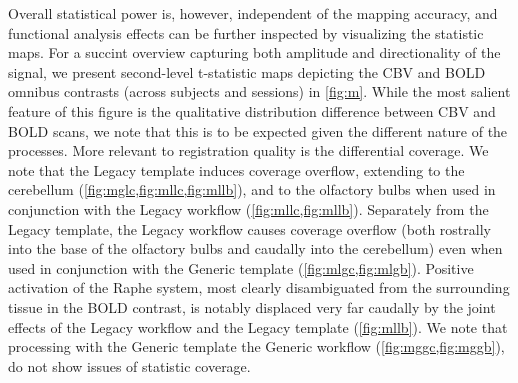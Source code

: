 Overall statistical power is, however, independent of the mapping accuracy, and functional analysis effects can be further inspected by visualizing the statistic maps.
For a succint overview capturing both amplitude and directionality of the signal, we present second-level t-statistic maps depicting the CBV and BOLD omnibus contrasts (across subjects and sessions) in \cref{fig:m}.
While the most salient feature of this figure is the qualitative distribution difference between CBV and BOLD scans, we note that this is to be expected given the different nature of the processes.
More relevant to registration quality is the differential coverage.
We note that the Legacy template induces coverage overflow, extending to the cerebellum (\cref{fig:mglc,fig:mllc,fig:mllb}), and to the olfactory bulbs when used in conjunction with the Legacy workflow (\cref{fig:mllc,fig:mllb}).
Separately from the Legacy template, the Legacy workflow causes coverage overflow (both rostrally into the base of the olfactory bulbs and caudally into the cerebellum) even when used in conjunction with the Generic template (\cref{fig:mlgc,fig:mlgb}).
Positive activation of the Raphe system, most clearly disambiguated from the surrounding tissue in the BOLD contrast, is notably displaced very far caudally by the joint effects of the Legacy workflow and the Legacy template (\cref{fig:mllb}).
We note that processing with the Generic template the Generic workflow (\cref{fig:mggc,fig:mggb}), do not show issues of statistic coverage.

